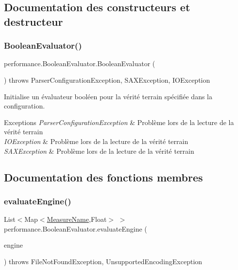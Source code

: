 \subsection{Documentation des constructeurs et destructeur}
\mbox{\label{classperformance_1_1BooleanEvaluator_a243542a428c224342cf251b2fdea7ea7}} 
\subsubsection{\texorpdfstring{Boolean\+Evaluator()}{BooleanEvaluator()}}
{\footnotesize\ttfamily performance.\+Boolean\+Evaluator.\+Boolean\+Evaluator (\begin{DoxyParamCaption}{ }\end{DoxyParamCaption}) throws Parser\+Configuration\+Exception, S\+A\+X\+Exception, I\+O\+Exception}

Initialise un évaluateur booléen pour la vérité terrain spécifiée dans la configuration.


\begin{DoxyExceptions}{Exceptions}
{\em Parser\+Configuration\+Exception} & Problème lors de la lecture de la vérité terrain \\
\hline
{\em I\+O\+Exception} & Problème lors de la lecture de la vérité terrain \\
\hline
{\em S\+A\+X\+Exception} & Problème lors de la lecture de la vérité terrain \\
\hline
\end{DoxyExceptions}


\subsection{Documentation des fonctions membres}
\mbox{\label{classperformance_1_1BooleanEvaluator_ade31854f4fa51d7d607012acb88a8d62}} 
\subsubsection{\texorpdfstring{evaluate\+Engine()}{evaluateEngine()}}
{\footnotesize\ttfamily List$<$Map$<$\hyperlink{enumperformance_1_1AbstractEvaluator_1_1MeasureName}{Measure\+Name},Float$>$ $>$ performance.\+Boolean\+Evaluator.\+evaluate\+Engine (\begin{DoxyParamCaption}\item[{\hyperlink{classquery_1_1AndQueryEngine}{And\+Query\+Engine}}]{engine }\end{DoxyParamCaption}) throws File\+Not\+Found\+Exception, Unsupported\+Encoding\+Exception}

